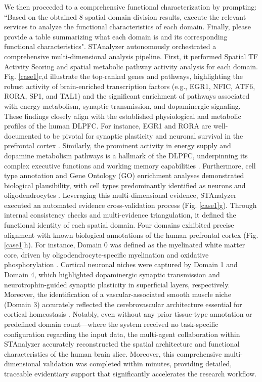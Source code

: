 \documentclass[a4,center,fleqn]{NAR}
\begin{document}
We then proceeded to a comprehensive functional characterization by prompting: ``Based on the obtained 8 spatial domain division results, execute the relevant services to analyze the functional characteristics of each domain. Finally, please provide a table summarizing what each domain is and its corresponding functional characteristics". STAnalyzer autonomously orchestrated {a comprehensive multi-dimensional analysis pipeline}. First, it performed Spatial TF Activity Scoring and spatial metabolic pathway activity analysis for each domain. Fig. \ref{case1}c,d illustrate the top-ranked genes and pathways, highlighting the robust activity of brain-enriched transcription factors (e.g., EGR1, NFIC, ATF6, RORA, SP1, and TAL1) and the significant enrichment of pathways associated with energy metabolism, synaptic transmission, and dopaminergic signaling. These findings closely align with the established physiological and metabolic profiles of the human DLPFC. For instance, EGR1 and RORA are well-documented to be pivotal for synaptic plasticity and neuronal survival in the prefrontal cortex \cite{duclot2017role,sarachana2013genome}. Similarly, the prominent activity in energy supply and dopamine metabolism pathways is a hallmark of the DLPFC, underpinning its complex executive functions and working memory capabilities \cite{magistretti2015cellular,cools2011inverted}. Furthermore, cell type annotation and Gene Ontology (GO) enrichment analyses demonstrated biological plausibility, with cell types predominantly identified as neurons and oligodendrocytes \cite{maynard2021transcriptome}. Leveraging this multi-dimensional evidence, STAnalyzer executed an automated evidence cross-validation process (Fig. \ref{case1}g). Through internal consistency checks and multi-evidence triangulation, it defined the functional identity of each spatial domain. Four domains exhibited precise alignment with known biological annotations of the human prefrontal cortex (Fig. \ref{case1}h). For instance, Domain 0 was defined as the myelinated white matter core, driven by oligodendrocyte-specific myelination and oxidative phosphorylation \cite{stadelmann2019myelin}. Cortical neuronal niches were captured by Domain 1 and Domain 4, which highlighted dopaminergic synaptic transmission \cite{seamans2004principal} and neurotrophin-guided synaptic plasticity \cite{zeng2012large} in superficial layers, respectively. Moreover, the identification of a vascular-associated smooth muscle niche (Domain 3) accurately reflected the cerebrovascular architecture essential for cortical homeostasis \cite{iadecola2017neurovascular}. Notably, even without any prior tissue-type annotation or predefined domain count—where the system received no task-specific configuration regarding the input data, the multi-agent collaboration within STAnalyzer accurately reconstructed the spatial architecture and functional characteristics of the human brain slice. Moreover, this comprehensive multi-dimensional validation was completed within minutes, providing detailed, traceable evidentiary support that significantly accelerates the research workflow.
\end{document}
